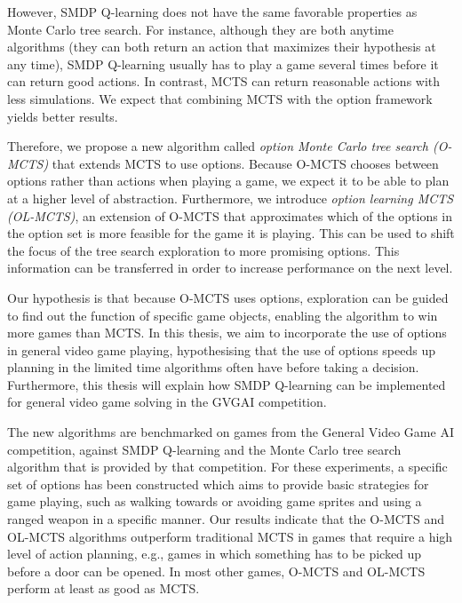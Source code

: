 However, SMDP Q-learning does not have the same favorable properties as Monte Carlo tree
search. For instance, although they are both anytime algorithms (they can both
return an action that maximizes their hypothesis at any time), SMDP Q-learning
usually has to play a game several times before it can return good actions.
In contrast, MCTS can return reasonable actions with less simulations.  We expect
that combining MCTS with the option framework yields better results.

Therefore, we propose a new algorithm called \emph{option Monte Carlo tree
search (O-MCTS)} that extends MCTS to use options. Because O-MCTS chooses
between options rather than actions when playing a game, we expect it to be able
to plan at a higher level of abstraction. Furthermore, we introduce \emph{option
learning MCTS (OL-MCTS)}, an extension of O-MCTS that approximates which of the
options in the option set is more feasible for the game it is playing. This can
be used to shift the focus of the tree search exploration to more promising
options. This information can be transferred in order to increase performance on
the next level.

Our hypothesis is that because O-MCTS uses options, exploration can be guided to
find out the function of specific game objects, enabling the algorithm to win
more games than MCTS. In this thesis, we aim to incorporate the use of options
in general video game playing, hypothesising that the use of options speeds up
planning in the limited time algorithms often have before taking a decision.
Furthermore, this thesis will explain how SMDP Q-learning can be implemented for
general video game solving in the GVGAI competition.  

The new algorithms are benchmarked on games from the General Video Game AI
competition, against SMDP Q-learning and the Monte Carlo tree search algorithm
that is provided by that competition. For these experiments, a specific set of
options has been constructed which aims to provide basic strategies for game
playing, such as walking towards or avoiding game sprites and using a ranged
weapon in a specific manner. Our results indicate that the O-MCTS and OL-MCTS
algorithms outperform traditional MCTS in games that require a high level of
action planning, e.g., games in which something has to be picked up before a
door can be opened. In most other games, O-MCTS and OL-MCTS perform at least as
good as MCTS.

